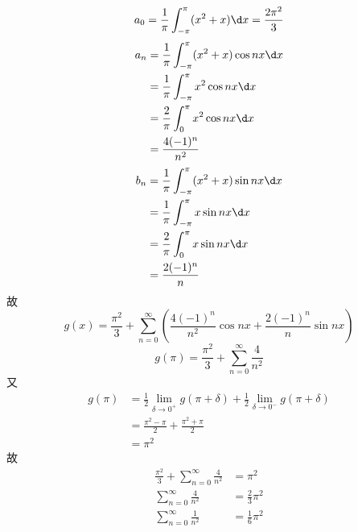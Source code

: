 \documentclass{phyasgn}
\begin{document}
\begin{sol}[1]
    $$a_0=\frac{1}{\pi}\int_{-\pi}^{\pi}(x^2+x)\d x=\frac{2\pi^2}{3}$$
    \begin{align*}
        a_n&=\frac{1}{\pi}\int_{-\pi}^{\pi}(x^2+x)\cos nx\d x\\
        &=\frac{1}{\pi}\int_{-\pi}^{\pi}x^2\cos nx\d x\\
        &=\frac{2}{\pi}\int_{0}^{\pi}x^2\cos nx\d x\\
        &=\frac{4(-1)^n}{n^2}
    \end{align*}
    \begin{align*}
        b_n&=\frac{1}{\pi}\int_{-\pi}^{\pi}(x^2+x)\sin nx\d x\\
        &=\frac{1}{\pi}\int_{-\pi}^{\pi}x\sin nx\d x\\
        &=\frac{2}{\pi}\int_{0}^{\pi}x\sin nx\d x\\
        &=\frac{2(-1)^n}{n}
    \end{align*}
    故
    $$g(x)=\frac{\pi^2}{3}+\sum_{n=0}^{\infty}(\frac{4(-1)^n}{n^2}\cos nx+\frac{2(-1)^n}{n}\sin nx)$$
    $$g(\pi)=\frac{\pi^2}{3}+\sum_{n=0}^{\infty}\frac{4}{n^2}$$
    又
    \begin{align*}
        g(\pi)&=\frac{1}{2}\lim_{\delta\to0^+}g(\pi+\delta)+\frac{1}{2}\lim_{\delta\to0^-} g(\pi+\delta)\\
        &=\frac{\pi^2-\pi}{2}+\frac{\pi^2+\pi}{2}\\
        &=\pi^2
    \end{align*}
    故
    \begin{align*}
        \frac{\pi^2}{3}+\sum_{n=0}^{\infty}\frac{4}{n^2} &=\pi^2\\
        \sum_{n=0}^{\infty}\frac{4}{n^2} &=\frac{2}{3}\pi^2\\
        \sum_{n=0}^{\infty}\frac{1}{n^2} &=\frac{1}{6}\pi^2\\
    \end{align*}
\end{sol}\par
\end{document}
